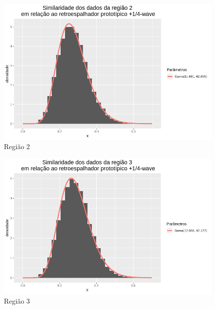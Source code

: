 \documentclass[12pt]{article}
\begin{document}
\begin{figure}[!h]
    \centering
    \vspace{0.1\linewidth}
    \includegraphics[width = \linewidth]{../../Images/Report_18_12_20/pwv_region2.png}
    \caption{Região 2}
    \label{fig:pwv_r2}
\end{figure}

\begin{figure}[!h]
    \centering
    \vspace{0.1\linewidth}
    \includegraphics[width = \linewidth]{../../Images/Report_18_12_20/pwv_region3.png}
    \caption{Região 3}
    \label{fig:pwv_r3}
\end{figure}
\end{document}
